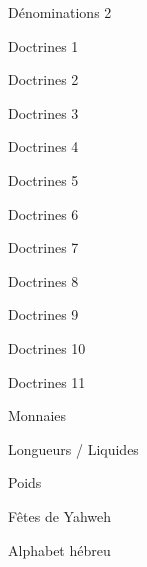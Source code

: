 \documentclass[10pt]{book}
\begin{document}
\begin{center}Dénominations 2\end{center}\clearpage
{}\clearpage
\begin{center}Doctrines 1\end{center}\clearpage
\begin{center}Doctrines 2\end{center}\clearpage
\begin{center}Doctrines 3\end{center}\clearpage
\begin{center}Doctrines 4\end{center}\clearpage
\begin{center}Doctrines 5\end{center}\clearpage
\begin{center}Doctrines 6\end{center}\clearpage
\begin{center}Doctrines 7\end{center}\clearpage
\begin{center}Doctrines 8\end{center}\clearpage
\begin{center}Doctrines 9\end{center}\clearpage
\begin{center}Doctrines 10\end{center}\clearpage
\begin{center}Doctrines 11\end{center}\clearpage
{}\clearpage
\begin{center}Monnaies\end{center}\clearpage
{}\clearpage
\begin{center}Longueurs / Liquides\end{center}\clearpage
{}\clearpage
\begin{center}Poids\end{center}\clearpage
{}\clearpage
\begin{center}Fêtes de Yahweh\end{center}\clearpage
{}\clearpage
\begin{center}Alphabet hébreu\end{center}\clearpage
\end{document}
